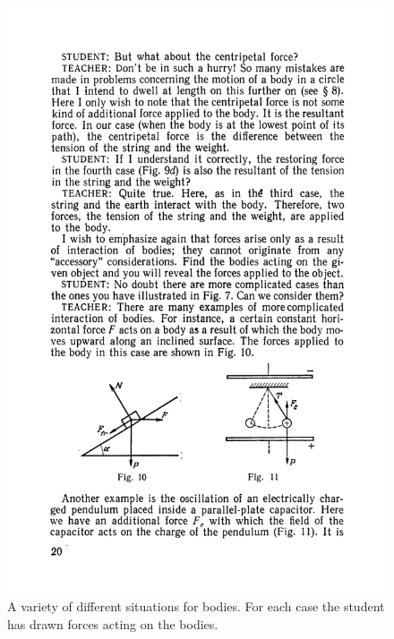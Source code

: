 \documentclass[a4paper,sfsidenotes]{tufte-book}
\begin{document}
\begin{figure}
\centering
\includegraphics[width=0.4\linewidth]{fig-010a.pdf}
\caption{A variety of different situations for bodies. For each case the student has drawn forces acting on the bodies.}
\label{fig-10}
\end{figure}
\end{document}
